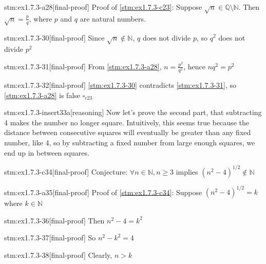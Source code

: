 \begin{stm}{stm:ex1.7.3-a28}[final-proof]
Proof of \ref{stm:ex1.7.3-c23}: Suppose $\sqrt{n} \in \mathbb{Q} \setminus \mathbb{N}$. Then $\sqrt{n} = \frac{p}{q}$, where $p$ and $q$ are natural numbers.
\end{stm}

\begin{stm}{stm:ex1.7.3-30}[final-proof]
Since $\sqrt{n} \notin \mathbb{N}$, $q$ does not divide $p$, so $q^2$ does not divide $p^2$
\end{stm}

\begin{stm}{stm:ex1.7.3-31}[final-proof]
From \ref{stm:ex1.7.3-a28}, $n = \frac{p^2}{q^2}$, hence $n q^2 = p^2$
\end{stm}

\begin{stm}{stm:ex1.7.3-32}[final-proof]
\ref{stm:ex1.7.3-30} contradicts \ref{stm:ex1.7.3-31}, so \ref{stm:ex1.7.3-a28} is false $\square_{c23}$
\end{stm}

\begin{stm}{stm:ex1.7.3-insert33a}[reasoning]
Now let's prove the second part, that subtracting 4 makes the number no longer square. Intuitively, this seems true because the distance between consecutive squares will eventually be greater than any fixed number, like 4, so by subtracting a fixed number from large enough squares, we end up in between squares.
\end{stm}

\begin{stm}{stm:ex1.7.3-c34}[final-proof]
Conjecture: $\forall n \in \mathbb{N}, n \ge 3$ implies $(n^2 - 4)^{1/2} \notin \mathbb{N}$
\end{stm}

\begin{stm}{stm:ex1.7.3-a35}[final-proof]
Proof of \ref{stm:ex1.7.3-c34}: Suppose $(n^2 - 4)^{1/2} = k$ where $k \in \mathbb{N}$
\end{stm}

\begin{stm}{stm:ex1.7.3-36}[final-proof]
Then $n^2 - 4 = k^2$
\end{stm}

\begin{stm}{stm:ex1.7.3-37}[final-proof]
So $n^2 - k^2 = 4$
\end{stm}

\begin{stm}{stm:ex1.7.3-38}[final-proof]
Clearly, $n > k$
\end{stm}

